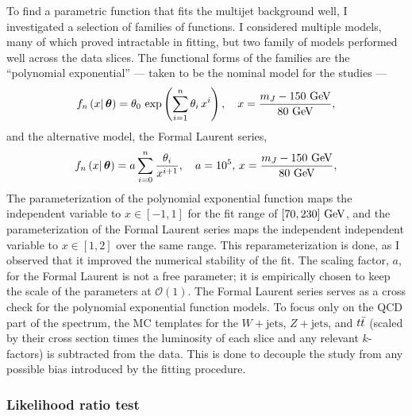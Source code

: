 To find a parametric function that fits the multijet background well, I investigated a selection of families of functions.
I considered multiple models, many of which proved intractable in fitting, but two family of models performed well across the \CRQCD{} data slices.
The functional forms of the families are the ``polynomial exponential'' --- taken to be the nominal model for the studies ---
\begin{equation}
 f_{n} \left(x \middle|\,\boldsymbol{\theta}\right) = \theta_{0}\, \exp\left(\sum_{i=1}^{n} \theta_{i}\,x^{i}\right), \quad x = \frac{m_{J} - 150~\mathrm{GeV}}{80~\mathrm{GeV}},
 \label{eq:poly_exp}
\end{equation}
and the alternative model, the Formal Laurent series,
\begin{equation}
 f_{n} \left(x \middle|\,\boldsymbol{\theta}\right) = a \sum_{i=0}^{n} \frac{\theta_{i}}{x^{i+1}}, \quad a=10^{5},\,x = \frac{m_{J} - 150~\mathrm{GeV}}{80~\mathrm{GeV}},
 \label{eq:formal_laurent}
\end{equation}
The parameterization of the polynomial exponential function maps the independent variable to $x \in \left[-1,1\right]$ for the fit range of $[70,230]~\mathrm{GeV}$, and the parameterization of the Formal Laurent series maps the independent independent variable to $x \in \left[1,2\right]$ over the same range.
This reparameterization is done, as I observed that it improved the numerical stability of the fit.
The scaling factor, $a$, for the Formal Laurent is not a free parameter; it is empirically chosen to keep the scale of the parameters at $\mathcal{O}(1)$.
The Formal Laurent series serves as a cross check for the polynomial exponential function models.
To focus only on the QCD part of the spectrum, the MC templates for the $W+\mathrm{jets}$, $Z+\mathrm{jets}$, and $t\bar{t}$ (scaled by their cross section times the luminosity of each slice and any relevant $k$-factors) is subtracted from the data.
This is done to decouple the study from any possible bias introduced by the fitting procedure.

\subsubsection{Likelihood ratio test}

